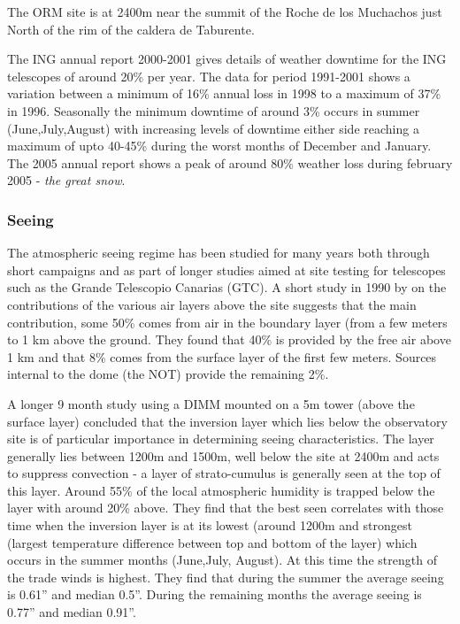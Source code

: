 The ORM site is at 2400m near the summit of the Roche de los Muchachos just North of the rim of the caldera de Taburente. 

The ING annual report 2000-2001 gives details of weather downtime for the ING telescopes of around 20\% per year. The data for period 1991-2001 shows a variation between a minimum of 16\% annual loss in 1998 to a maximum of 37\% in 1996. Seasonally the minimum downtime of around 3\% occurs in summer (June,July,August) with increasing levels of downtime either side reaching a maximum of upto 40-45\% during the worst months of December and January. The 2005 annual report shows a peak of around 80\% weather loss during february 2005 - \emph{the great snow}. 


\subsubsection{Seeing}
The atmospheric seeing regime has been studied for many years both through short campaigns and as part of longer studies aimed at site testing for telescopes such as the Grande Telescopio Canarias (GTC).
 A short study in 1990 by \cite{vernin92optical} on the contributions of the various air layers above the site suggests that the main contribution, some 50\% comes from air in the boundary layer (from a few meters to 1 km above the ground. They found that 40\% is provided by the free air above 1 km and that 8\% comes from the surface layer of the first few meters. Sources internal to the dome (the NOT) provide the remaining 2\%.

A longer 9 month study \cite{munoz97nighttime} using a DIMM mounted on a 5m tower (above the surface layer) concluded that the inversion layer which lies below the observatory site is of particular importance in determining seeing characteristics. The layer generally lies between 1200m and 1500m, well below the site at 2400m and acts to suppress convection - a layer of strato-cumulus is generally seen at the top of this layer. Around 55\% of the local atmospheric humidity is trapped below the layer with around 20\% above. They find that the best seen correlates with those time when the inversion layer is at its lowest (around 1200m and strongest (largest temperature difference between top and bottom of the layer) which occurs in the summer months (June,July, August). At this time the strength of the trade winds is highest. They find that during the summer the average seeing is 0.61'' and median 0.5''. During the remaining months the average seeing is 0.77'' and median 0.91''. 

